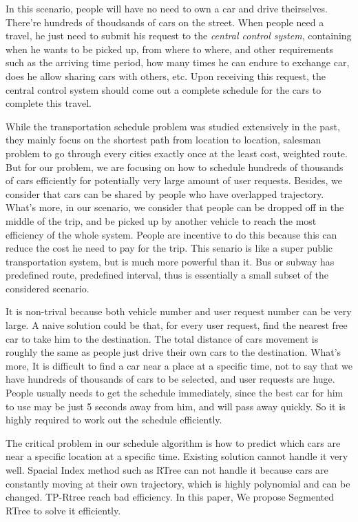 \documentclass{vldb}
\begin{document}
In this scenario, people will have no need to own a car and drive theirselves.
There're hundreds of thoudsands of cars on the street.
When people need a travel, he just need to submit his request to the \textit{central control system},
containing when he wants to be picked up, from where to where,
and other requirements such as the arriving time period,
how many times he can endure to exchange car, does he allow sharing cars with others, etc.
Upon receiving this request,
the central control system should come out a complete schedule for the cars to complete this travel.



While the transportation schedule problem was studied extensively in the past,
they mainly focus on the shortest path from location to location,
salesman problem to go through every cities exactly once at the least cost, weighted route.
But for our problem,
we are focusing on how to schedule hundreds of thousands of cars efficiently for
potentially very large amount of user requests.
Besides, we consider that cars can be shared by people who have overlapped trajectory.
What's more, in our scenario, we consider that people can be dropped off in the middle of the trip,
and be picked up by another vehicle to reach the most efficiency of the whole system.
People are incentive to do this because this can reduce the cost he need to pay for the trip.
This senario is like a super public transportation system,
but is much more powerful than it.
Bus or subway has predefined route, predefined interval,
thus is essentially a small subset of the considered scenario.

It is non-trival because both vehicle number and user request number can be very large.
A naive solution could be that, for every user request, find the nearest free car to take him to the destination.
The total distance of cars movement is roughly the same as people just drive their own cars to the destination.
What’s more, It is difficult to find a car near a place at a specific time,
not to say that we have hundreds of thousands of cars to be selected,
and user requests are huge. People usually needs to get the schedule immediately,
since the best car for him to use may be just 5 seconds away from him, and will pass away quickly.
So it is highly required to work out the schedule efficiently.

The critical problem in our schedule algorithm is
how to predict which cars are near a specific location at a specific time.
Existing solution cannot handle it very well.
Spacial Index method such as RTree can not handle it because cars are constantly moving at their own trajectory,
which is highly polynomial and can be changed.
TP-Rtree reach bad efficiency. In this paper, We propose Segmented RTree to solve it efficiently.
\end{document}
